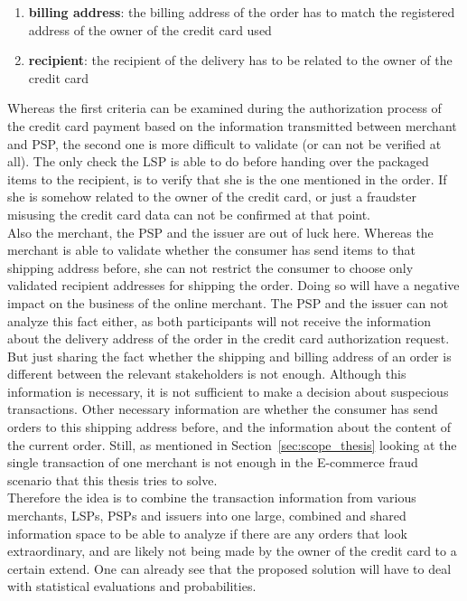 \begin{enumerate}
  \item \textbf{billing address}: the billing address of the order has to match the registered address of the owner of the credit card used
  \item \textbf{recipient}: the recipient of the delivery has to be related to the owner of the credit card
\end{enumerate}


Whereas the first criteria can be examined during the authorization process of the credit card payment based on the information transmitted between merchant and \gls{PSP}, the second one is more difficult to validate (or can not be verified at all). The only check the \gls{LSP} is able to do before handing over the packaged items to the recipient, is to verify that she is the one mentioned in the order. If she is somehow related to the owner of the credit card, or just a fraudster misusing the credit card data can not be confirmed at that point. \\

Also the merchant, the \gls{PSP} and the issuer are out of luck here. Whereas the merchant is able to validate whether the consumer has send items to that shipping address before, she can not restrict the consumer to choose only validated recipient addresses for shipping the order. Doing so will have a negative impact on the business of the online merchant. The \gls{PSP} and the issuer can not analyze this fact either, as both participants will not receive the information about the delivery address of the order in the credit card authorization request. \\

But just sharing the fact whether the shipping and billing address of an order is different between the relevant stakeholders is not enough. Although this information is necessary, it is not sufficient to make a decision about suspecious transactions. Other necessary information are whether the consumer has send orders to this shipping address before, and the information about the content of the current order. Still, as mentioned in Section~\ref{sec:scope_thesis} looking at the single transaction of one merchant is not enough in the \gls{E-commerce} fraud scenario that this thesis tries to solve. \\

Therefore the idea is to combine the transaction information from various merchants, \gls{LSP}s, \gls{PSP}s and issuers into one large, combined and shared information space to be able to analyze if there are any orders that look extraordinary, and are likely not being made by the owner of the credit card to a certain extend. One can already see that the proposed solution will have to deal with statistical evaluations and probabilities. \\


